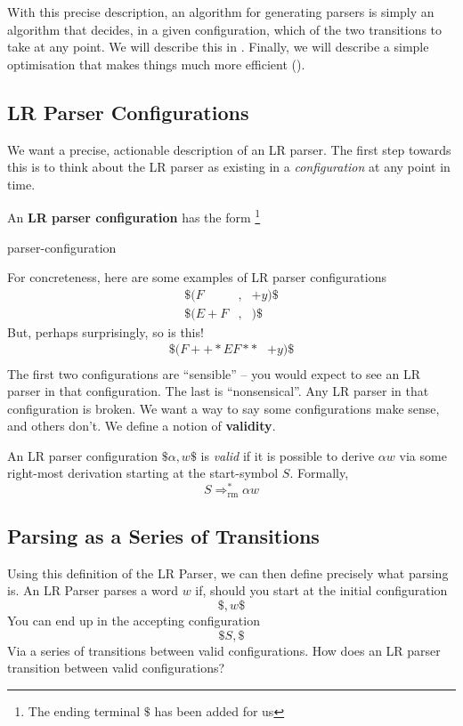 With this precise description, an algorithm for generating parsers is simply an algorithm that decides, in a given configuration, which of the two transitions to take at any point. We will describe this in . Finally, we will describe a simple optimisation that makes things much more efficient ().

\subsection{LR Parser Configurations}\label{section:lr-parser-configurations}
We want a precise, actionable description of an LR parser. The first step towards this is to think about the LR parser as existing in a \textit{configuration} at any point in time.

An \textbf{LR parser configuration} has the form \footnote{The ending terminal $\$$ has been added for us}
\begin{center}
    {parser-configuration}
\end{center}
For concreteness, here are some examples of LR parser configurations
\[\begin{array}{lcr}
     \$(F   &,& +y)\$  \\
     \$(E+F &,&   )\$
\end{array}\]
But, perhaps surprisingly, so is this!
\[\begin{array}{lr}
     \$(F++*EF** & +y)\$  \\
\end{array}\]
The first two configurations are ``sensible'' -- you would expect to see an LR parser in that configuration. The last is ``nonsensical''. Any LR parser in that configuration is broken. We want a way to say some configurations make sense, and others don't. We define a notion of \textbf{validity}.

An LR parser configuration $\$\alpha, w\$$ is \textit{valid} if it is possible to derive $\alpha w$ via some right-most derivation starting at the start-symbol $S$. Formally,
\[S \Rightarrow^*_{\text{rm}} \alpha w\]

\subsection{Parsing as a Series of Transitions}\label{section:lr-goals}
Using this definition of the LR Parser, we can then define precisely what parsing is. An LR Parser parses a word $w$ if, should you start at the initial configuration
\[\$, w\$\]
You can end up in the accepting configuration
\[\$S, \$\]
Via a series of transitions between valid configurations. How does an LR parser transition between valid configurations?

